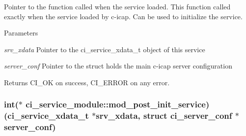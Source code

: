 Pointer to the function called when the service loaded. This function called exactly when the service loaded by c-\/icap. Can be used to initialize the service. 
\begin{DoxyParams}{Parameters}
\item[{\em srv\_\-xdata}]Pointer to the ci\_\-service\_\-xdata\_\-t object of this service \item[{\em server\_\-conf}]Pointer to the struct holds the main c-\/icap server configuration \end{DoxyParams}
\begin{DoxyReturn}{Returns}
CI\_\-OK on success, CI\_\-ERROR on any error. 
\end{DoxyReturn}
\hypertarget{structci__service__module_a3975fa968c80e30d77f3f1bac100e9e1}{
\subsubsection[{mod\_\-post\_\-init\_\-service}]{\setlength{\rightskip}{0pt plus 5cm}int($\ast$ {\bf ci\_\-service\_\-module::mod\_\-post\_\-init\_\-service})({\bf ci\_\-service\_\-xdata\_\-t} $\ast$srv\_\-xdata, struct {\bf ci\_\-server\_\-conf} $\ast$server\_\-conf)}}
\label{structci__service__module_a3975fa968c80e30d77f3f1bac100e9e1}


